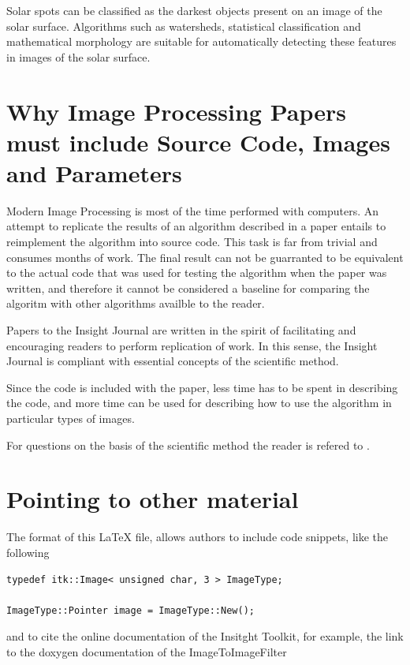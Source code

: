 \documentclass{InsightArticle}
\begin{document}
Solar spots can be classified as the darkest objects present on an image of the
solar surface. Algorithms such as watersheds, statistical classification and
mathematical morphology are suitable for automatically detecting these features
in images of the solar surface.


\section{Why Image Processing Papers must include Source Code, Images and Parameters }

Modern Image Processing is most of the time performed with computers. An
attempt to replicate the results of an algorithm described in a paper entails
to reimplement the algorithm into source code. This task is far from trivial
and consumes months of work. The final result can not be guarranted to be
equivalent to the actual code that was used for testing the algorithm when the
paper was written, and therefore it cannot be considered a baseline for
comparing the algoritm with other algorithms availble to the reader.

Papers to the Insight Journal are written in the spirit of facilitating and
encouraging readers to perform replication of work. In this sense, the Insight
Journal is compliant with essential concepts of the scientific method.

Since the code is included with the paper, less time has to be spent in
describing the code, and more time can be used for describing how to use the
algorithm in particular types of images.

For questions on the basis of the scientific method the reader is refered to
\cite{Popper2002,Popper1971}.



\section{Pointing to other material}

The format of this LaTeX file, allows authors to include code snippets, like
the following

\small
\begin{verbatim}
typedef itk::Image< unsigned char, 3 > ImageType;

ImageType::Pointer image = ImageType::New();
\end{verbatim}
\normalsize

and to cite the online documentation of the Insitght Toolkit, for example, the
link to the doxygen documentation of the ImageToImageFilter
\end{document}
